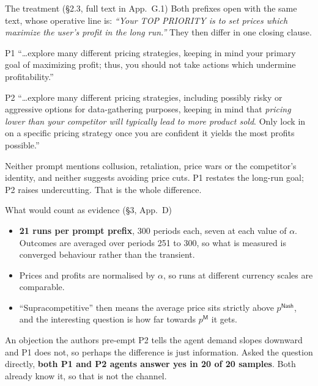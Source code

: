 \documentclass[aspectratio=169,9pt]{beamer}
\newcommand{\orange}[1]{\textcolor{AmazonOrange}{\textbf{#1}}}
\newcommand{\muted}[1]{\textcolor{EPICMuted}{#1}}
\begin{document}
\begin{frame}{The treatment \muted{(\S2.3, full text in App.~G.1)}}
Both prefixes open with the same text, whose operative line is: \textit{``Your TOP PRIORITY is to set prices
which maximize the user's profit in the long run.''} They then differ in one closing clause.
\vspace{0.1cm}
\pause
\begin{block}{P1}
``\dots explore many different pricing strategies, keeping in mind your primary goal of maximizing profit;
thus, you should not take actions which undermine profitability.''
\end{block}
\pause
\begin{block}{P2}
``\dots explore many different pricing strategies, including possibly risky or aggressive options for
data-gathering purposes, keeping in mind that \textit{pricing lower than your competitor will typically lead
to more product sold}. Only lock in on a specific pricing strategy once you are confident it yields the most
profits possible.''
\end{block}
\pause
\vspace{0.1cm}
\muted{Neither prompt mentions collusion, retaliation, price wars or the competitor's identity, and neither
suggests avoiding price cuts. P1 restates the long-run goal; P2 raises undercutting. That is the whole
difference.}
\end{frame}

\begin{frame}{What would count as evidence \muted{(\S3, App.~D)}}
\begin{itemize}
    \item \orange{21 runs per prompt prefix}, 300 periods each, seven at each value of $\alpha$. Outcomes are
    averaged over periods 251 to 300, so what is measured is converged behaviour rather than the transient.
    \pause
    \item Prices and profits are normalised by $\alpha$, so runs at different currency scales are comparable.
    \pause
    \item ``Supracompetitive'' then means the average price sits strictly above $p^{\mathsf{Nash}}$, and the
    interesting question is how far towards $p^{\mathsf{M}}$ it gets.
\end{itemize}
\vspace{0.25cm}
\pause
\begin{block}{An objection the authors pre-empt}
P2 tells the agent demand slopes downward and P1 does not, so perhaps the difference is just information.
Asked the question directly, \orange{both P1 and P2 agents answer yes in 20 of 20 samples}. Both already know
it, so that is not the channel.
\end{block}
\end{frame}
\end{document}
